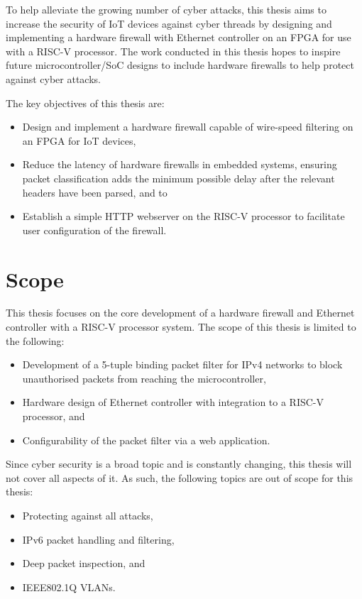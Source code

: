 To help alleviate the growing number of cyber attacks, this thesis aims to increase the security of IoT devices against cyber threads by designing and implementing a hardware firewall with Ethernet controller on an FPGA for use with a RISC-V processor. The work conducted in this thesis hopes to inspire future microcontroller/SoC designs to include hardware firewalls to help protect against cyber attacks. 

The key objectives of this thesis are:

\begin{itemize}
    \item Design and implement a hardware firewall capable of wire-speed filtering on an FPGA for IoT devices,
    \item Reduce the latency of hardware firewalls in embedded systems, ensuring packet classification adds the minimum possible delay after the relevant headers have been parsed, and to
    \item Establish a simple HTTP webserver on the RISC-V processor to facilitate user configuration of the firewall.
\end{itemize}


\section{Scope}

This thesis focuses on the core development of a hardware firewall and Ethernet controller with a RISC-V processor system. The scope of this thesis is limited to the following:

\begin{itemize}
    \item Development of a 5-tuple binding packet filter for IPv4 networks to block unauthorised packets from reaching the microcontroller,
    \item Hardware design of Ethernet controller with integration to a RISC-V processor, and
    \item Configurability of the packet filter via a web application.
\end{itemize}

\noindent Since cyber security is a broad topic and is constantly changing, this thesis will not cover all aspects of it. As such, the following topics are out of scope for this thesis:

\begin{itemize}
    \item Protecting against all attacks,
    \item IPv6 packet handling and filtering,
    \item Deep packet inspection, and 
    \item IEEE802.1Q VLANs.
\end{itemize}
